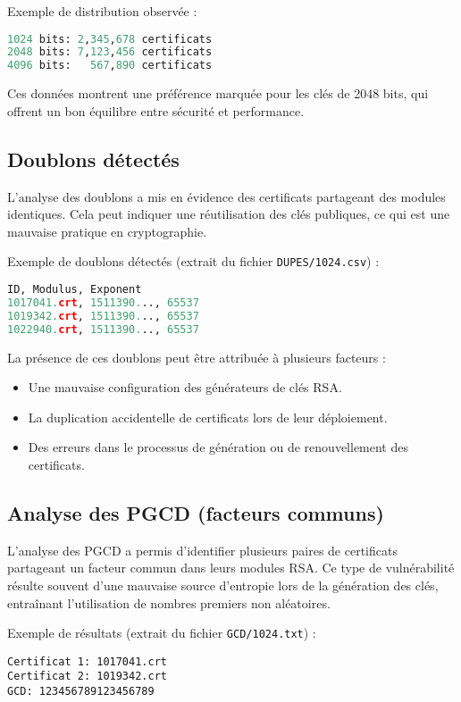 \documentclass[11pt,a4paper]{article}
\begin{document}
Exemple de distribution observée :
\begin{lstlisting}[language=Python, basicstyle=\small]
1024 bits: 2,345,678 certificats
2048 bits: 7,123,456 certificats
4096 bits:   567,890 certificats
\end{lstlisting}

Ces données montrent une préférence marquée pour les clés de 2048 bits, qui offrent un bon équilibre entre sécurité et performance.

\subsection{Doublons détectés}
L'analyse des doublons a mis en évidence des certificats partageant des modules identiques. Cela peut indiquer une réutilisation des clés publiques, ce qui est une mauvaise pratique en cryptographie.

Exemple de doublons détectés (extrait du fichier \texttt{DUPES/1024.csv}) :
\begin{lstlisting}[language=Python, basicstyle=\small]
ID, Modulus, Exponent
1017041.crt, 1511390..., 65537
1019342.crt, 1511390..., 65537
1022940.crt, 1511390..., 65537
\end{lstlisting}

La présence de ces doublons peut être attribuée à plusieurs facteurs :
\begin{itemize}
    \item Une mauvaise configuration des générateurs de clés RSA.
    \item La duplication accidentelle de certificats lors de leur déploiement.
    \item Des erreurs dans le processus de génération ou de renouvellement des certificats.
\end{itemize}

\subsection{Analyse des PGCD (facteurs communs)}
L'analyse des PGCD a permis d'identifier plusieurs paires de certificats partageant un facteur commun dans leurs modules RSA. Ce type de vulnérabilité résulte souvent d'une mauvaise source d'entropie lors de la génération des clés, entraînant l'utilisation de nombres premiers non aléatoires.

Exemple de résultats (extrait du fichier \texttt{GCD/1024.txt}) :
\begin{lstlisting}[basicstyle=\small]
Certificat 1: 1017041.crt
Certificat 2: 1019342.crt
GCD: 123456789123456789
\end{lstlisting}
\end{document}
